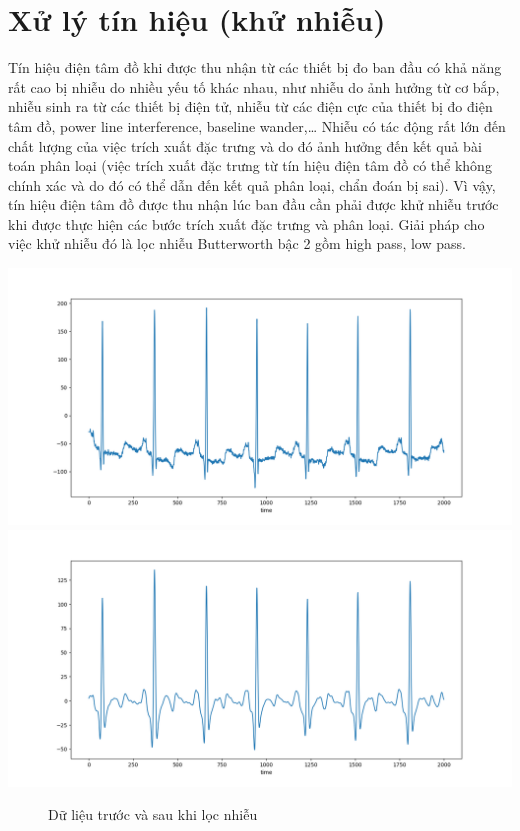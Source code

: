 \section{Xử lý tín hiệu (khử nhiễu)}
Tín hiệu điện tâm đồ khi được thu nhận từ các thiết bị đo ban đầu có khả năng rất cao bị nhiễu do nhiều yếu tố khác nhau, như nhiễu do ảnh hưởng từ cơ bắp, nhiễu sinh ra từ các thiết bị điện tử, nhiễu từ các điện cực của thiết bị đo điện tâm đồ, power line interference, baseline wander,… Nhiễu có tác động rất lớn đến chất lượng của việc trích xuất đặc trưng và do đó ảnh hưởng đến kết quả bài toán phân loại (việc trích xuất đặc trưng từ tín hiệu điện tâm đồ có thể không chính xác và do đó có thể dẫn đến kết quả phân loại, chẩn đoán bị sai). Vì vậy, tín hiệu điện tâm đồ được thu nhận lúc ban đầu cần phải được khử nhiễu trước khi được thực hiện các bước trích xuất đặc trưng và phân loại. Giải pháp cho việc khử nhiễu đó là lọc nhiễu Butterworth bậc 2 gồm high pass, low pass.
\begin{center}
         \includegraphics[width=.9\linewidth]{image/chapter5/noise.png}
         \includegraphics[width=.9\linewidth]{image/chapter5/hlp.png}
    \begin{figure}[!htb]
       \caption{Dữ liệu trước và sau khi lọc nhiễu}
    \end{figure}
\end{center}

